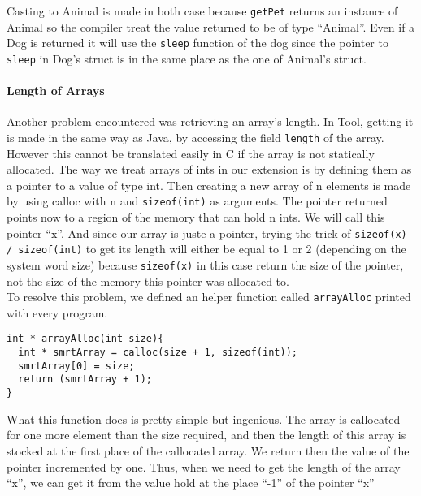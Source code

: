 Casting to Animal is made in both case because {\lstinline[basicstyle=\small\ttfamily]|getPet|} returns an instance of Animal so the compiler treat the value returned to be of type ``Animal''. Even if a Dog is returned it will use the {\lstinline[basicstyle=\small\ttfamily]|sleep|} function of the dog since the pointer to {\lstinline[basicstyle=\small\ttfamily]|sleep|} in Dog's struct is in the same place as the one of Animal's struct.

\paragraph{Length of Arrays}
Another problem encountered was retrieving an array's length. In Tool, getting it is made in the same way as Java, by accessing the field {\lstinline[basicstyle=\small\ttfamily]|length|} of the array. However this cannot be translated easily in C if the array is not statically allocated. The way we treat arrays of ints in our extension is by defining them as a pointer to a value of type int. Then creating a new array of n elements is made by using calloc with n and {\lstinline[basicstyle=\small\ttfamily]|sizeof(int)|} as arguments. The pointer returned points now to a region of the memory that can hold n ints. We will call this pointer ``x''. And since our array is juste a pointer, trying the trick of {\lstinline[basicstyle=\small\ttfamily]|sizeof(x) / sizeof(int)|} to get its length will either be equal to 1 or 2 (depending on the system word size) because {\lstinline[basicstyle=\small\ttfamily]|sizeof(x)|} in this case return the size of the pointer, not the size of the memory this pointer was allocated to.\\
To resolve this problem, we defined an helper function called {\lstinline[basicstyle=\small\ttfamily]|arrayAlloc|} printed with every program.

\begin{lstlisting}
int * arrayAlloc(int size){
  int * smrtArray = calloc(size + 1, sizeof(int));
  smrtArray[0] = size;
  return (smrtArray + 1);
}
\end{lstlisting}

What this function does is pretty simple but ingenious. The array is callocated for one more element than the size required, and then the length of this array is stocked at the first place of the callocated array. We return then the value of the pointer incremented by one. Thus, when we need to get the length of the array ``x'', we can get it from the value hold at the place ``-1'' of the pointer ``x''


